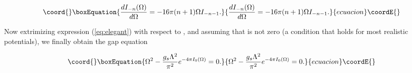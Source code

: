 \documentclass[a4paper,a4paper]{article}
\begin{document}
\begin{equation}\coord{}\boxEquation{
\frac{dI_{-n}(\Omega)}{d\Omega}=-16\pi(n+1)\Omega I_{-n-1}.
}{
\frac{dI_{-n}(\Omega)}{d\Omega}=-16\pi(n+1)\Omega I_{-n-1}.
}{ecuacion}\coordE{}\end{equation}

\noindent Now extrimizing expression (\ref{eq:elegant}) with respect to \myHighlight{$\Omega$}\coordHE{}, and
assuming that \coordHE{} is not zero (a condition that holds for most realistic
potentials), we finally obtain the gap equation

\begin{equation}\coord{}\boxEquation{\label{eq:omegaeq}
\Omega^2-\frac{g_s\Lambda^2}{\pi^2} e^{-4\pi I_0(\Omega)}=0.
}{\Omega^2-\frac{g_s\Lambda^2}{\pi^2} e^{-4\pi I_0(\Omega)}=0.
}{ecuacion}\coordE{}\end{equation}
\end{document}
